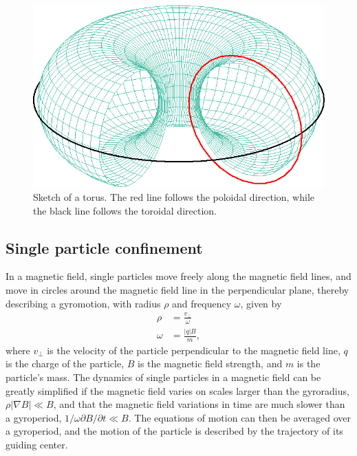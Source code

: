 \documentclass[my_thesis.tex]{subfiles}
\begin{document}
\begin{figure}
    \centering
    \includegraphics[width=.75\linewidth]{images/torus.png}
    \caption{Sketch of a torus. The red line follows the poloidal direction, while the black line follows the toroidal direction.}
    \label{fig.torus}
\end{figure}

\subsection{Single particle confinement}\label{sec.single particle confinement}
In a magnetic field, single particles move freely along the magnetic field lines, and move in circles around the magnetic field line in the perpendicular plane, thereby describing a gyromotion, with radius $\rho$ and frequency $\omega$, given by
\begin{align}
    \rho &= \frac{v_\perp}{\omega}\\
    \omega &= \frac{|q|B}{m},
\end{align}
where $v_\perp$ is the velocity of the particle perpendicular to the magnetic field line, $q$ is the charge of the particle, $B$ is the magnetic field strength, and $m$ is the particle's mass. The dynamics of single particles in a magnetic field can be greatly simplified if the magnetic field varies on scales larger than the gyroradius, $\rho|\nabla B|\ll B$, and that the magnetic field variations in time are much slower than a gyroperiod, $1/\omega \partial B/\partial t \ll B$. The equations of motion can then be averaged over a gyroperiod, and the motion of the particle is described by the trajectory of its guiding center.
\end{document}
